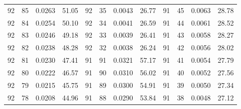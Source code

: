 \begin{tabular}{llll|llll|llll}
92 & 85 & 0.0263 & 51.05 & 92 & 35 & 0.0043 & 26.77 & 91 & 45 & 0.0063 & 28.78\\
92 & 84 & 0.0254 & 50.10 & 92 & 34 & 0.0041 & 26.59 & 91 & 44 & 0.0061 & 28.52\\
92 & 83 & 0.0246 & 49.18 & 92 & 33 & 0.0039 & 26.41 & 91 & 43 & 0.0058 & 28.27\\
92 & 82 & 0.0238 & 48.28 & 92 & 32 & 0.0038 & 26.24 & 91 & 42 & 0.0056 & 28.02\\
92 & 81 & 0.0230 & 47.41 & 91 & 91 & 0.0321 & 57.17 & 91 & 41 & 0.0054 & 27.79\\
92 & 80 & 0.0222 & 46.57 & 91 & 90 & 0.0310 & 56.02 & 91 & 40 & 0.0052 & 27.56\\
92 & 79 & 0.0215 & 45.75 & 91 & 89 & 0.0300 & 54.91 & 91 & 39 & 0.0050 & 27.34\\
92 & 78 & 0.0208 & 44.96 & 91 & 88 & 0.0290 & 53.84 & 91 & 38 & 0.0048 & 27.12\\
\bottomrule
\end{tabular}
\newpage
